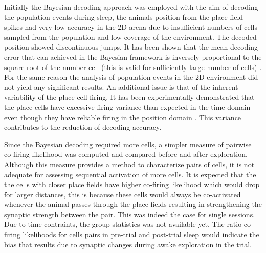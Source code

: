 Initially the Bayesian decoding approach was employed with the aim of decoding the population events during sleep, the animals position from the place field spikes had very low accuracy in the 2D arena due to insufficient numbers of cells sampled from the population and low coverage of the environment. The decoded position showed discontinuous jumps. It has been shown that the mean decoding error that can achieved in the Bayesian framework is inversely proportional to the square root of the number cell (this is valid for sufficiently large number of cells) \cite{Zhang2013}. For the same reason the analysis of population events in the 2D environment did not yield any significant results. An additional issue is that of the inherent variability of the place cell firing. It has been experimentally demonstrated that the place cells have excessive firing variance than expected in the time domain even though they have reliable firing in the position domain \cite{Fenton1998}. This variance contributes to the reduction of decoding accuracy.  

Since the Bayesian decoding required more cells, a simpler measure of pairwise co-firing likelihood was computed and compared before and after exploration. Although this measure provides a method to characterize pairs of cells, it is not adequate for assessing sequential activation of more cells. It is expected that the the cells with closer place fields have higher co-firing likelihood which would drop for larger distances, this is because these cells would always be co-activated whenever the animal passes through the place fields resulting in strengthening the synaptic strength between the pair. This was indeed the case for single sessions. Due to time contraints, the group statistics was not available yet. The ratio co-firing likelihoods for cells pairs in pre-trial and post-trial sleep would indicate the bias that results due to synaptic changes during awake exploration in the trial. 

